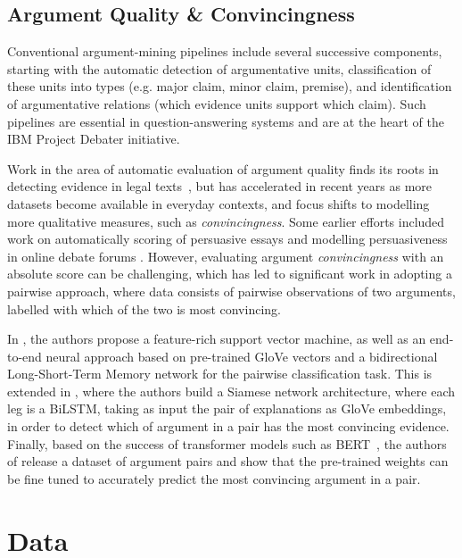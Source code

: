 \documentclass[runningheads]{llncs}
\begin{document}
\subsection{Argument Quality \& Convincingness}
Conventional argument-mining pipelines include several successive components, 
starting with the automatic detection of argumentative units, classification of 
these units into types (e.g. major claim, minor claim, premise), and 
identification of argumentative relations (which evidence units support which 
claim). 
Such pipelines are essential in question-answering systems 
\cite{lippi_argumentation_2016} and are at the heart of the IBM Project Debater 
initiative. 

Work in the area of automatic evaluation of argument quality finds its roots in 
detecting evidence in legal texts~\cite{moens_automatic_2007}, but has 
accelerated in recent years as more datasets become available in everyday 
contexts, and focus shifts to modelling more qualitative measures, such as 
\textit{convincingness}. 
Some earlier efforts included work on automatically 
scoring of persuasive essays \cite{persing_end--end_2016} and modelling 
persuasiveness in online debate forums \cite{tan_winning_2016}. 
However, evaluating argument \textit{convincingness} with an absolute score can 
be challenging, which has led to significant work in adopting a pairwise 
approach, where data consists of pairwise observations of two arguments, 
labelled with which of the two is most convincing.

In \cite{habernal_which_2016}, the authors propose a feature-rich support 
vector machine, as well as an end-to-end neural approach based on pre-trained 
GloVe vectors\cite{pennington_glove:_2014} and a bidirectional Long-Short-Term 
Memory network for the pairwise classification task. 
This is extended in \cite{gleize_are_2019}, where the authors build a Siamese 
network architecture, where each leg is a BiLSTM, taking as input the pair of 
explanations as GloVe embeddings, in order to detect which of argument in a 
pair has the most convincing evidence.
Finally, based on the success of transformer models such as 
BERT~\cite{devlin_bert_2018}, the authors of \cite{toledo_automatic_2019}  
release a dataset of argument pairs and show that the pre-trained weights can 
be fine tuned to accurately predict the most convincing argument in a pair.


\section{Data}
\end{document}
